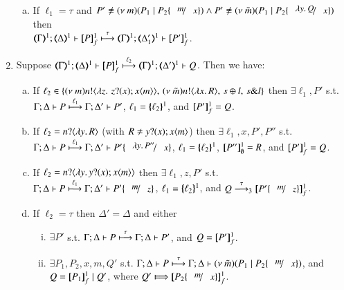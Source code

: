 \begin{proposition}
\begin{enumerate}[1.]
\begin{enumerate}[a)]
			\item If $\ell_1 = \tau$
			and $P' \not\scong \news{m}(P_1 \Par P_2\subst{m}{x}) \land P' \not\scong \news{\tilde{m}}(P_1 \Par P_2\subst{\abs{y}Q}{x})$
			then \\
			$\stytra{\mapt{\Gamma}^{1}}{\tau}{\mapt{\Delta}^{1}}{\pmapp{P}{1}{f}}{\mapt{\Delta'_1}^{1}}{ \pmapp{P'}{1}{f}
			}$.
			\end{enumerate}
			
		\item Suppose $\stytra{\mapt{\Gamma}^{1}}{\ell_2}{\mapt{\Delta}^{1}}{\pmapp{P}{1}{f}}{\mapt{\Delta'}^{1}}{Q}$.
		Then we have:
			\begin{enumerate}[a)]
		    \item 
		    If $\ell_2 \in \{\news{m}\bactout{n}{\abs{z}{\,\binp{z}{x} \appl{x}{m}}}, \,\news{\tilde{m}}\bactout{n}{\abs{x}R}, \,\bactsel{s}{l}, \,\bactbra{s}{l}   \}$
			then $\exists \ell_1, P'$ s.t. \\
			$\stytra{ \Gamma }{\ell_1}{ \Delta }{ P}{ \Delta' }{ P'}$, 
			$\ell_1 = \mapa{\ell_2}^{1}$, 
			and
			$\map{P'}^{1}_f = Q$.
			
			\item 
		    If $\ell_2 = \bactinp{n}{\abs{y}R}$ (with $R \neq \binp{y}{x} \appl{x}{m}$)
			then $\exists \ell_1, x, P', P''$ s.t. \\
			$\stytra{ \Gamma }{\ell_1}{ \Delta }{ P}{ \Delta' }{ P'\subst{\abs{y}P''}{x}}$, 
			$\ell_1 = \mapa{\ell_2}^{1}$, 
						$\map{P''}^{1}_\es = R$, and 			$\map{P'}^{1}_f = Q$.		
						
			\item 
		    If $\ell_2 = \bactinp{n}{\abs{y}\binp{y}{x} \appl{x}{m}}$ 
			then $\exists \ell_1, z, P'$ s.t. \\
			$\stytra{ \Gamma }{\ell_1}{ \Delta }{ P}{ \Delta' }{ P'\subst{m}{z}}$, 
			$\ell_1 = \mapa{\ell_2}^{1}$,
			and 
			$Q \by{\tau}_3  \map{P'\subst{m}{z}}^{1}_f$.	
		
			
			\item 
		    If $\ell_2 = \tau$ 
			then $\Delta' = \Delta$ and 
			either
			\begin{enumerate}[(i)]
			\item $\exists P'$ s.t. 
			$\stytra{ \Gamma }{\tau}{ \Delta }{ P}{ \Delta}{ P'}$, and $Q = \map{P'}^{1}_f$.	

			\item $\exists P_1, P_2, x, m, Q'$ s.t. 
			$\stytra{ \Gamma }{\tau}{ \Delta }{ P}{ \Delta}{\news{\tilde{m}}( P_1 \Par P_2\subst{m}{x}) }$, and 
			$Q = \map{P_1}^{1}_f \Par Q'$, where $Q'  \Hby{} \map{P_2\subst{m}{x}}^{1}_f$.


\end{enumerate}
\end{enumerate}
\end{enumerate}
\end{proposition}
